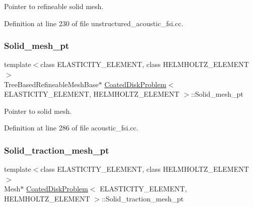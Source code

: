 Pointer to refineable solid mesh. 



Definition at line 230 of file unstructured\+\_\+acoustic\+\_\+fsi.\+cc.

\mbox{\label{classCoatedDiskProblem_aa9e9529dcb4bfd7793b868ab42a5d10e}} 
\subsubsection{\texorpdfstring{Solid\+\_\+mesh\+\_\+pt}{Solid\_mesh\_pt}\hspace{0.1cm}{\footnotesize\ttfamily [2/2]}}
{\footnotesize\ttfamily template$<$class E\+L\+A\+S\+T\+I\+C\+I\+T\+Y\+\_\+\+E\+L\+E\+M\+E\+NT, class H\+E\+L\+M\+H\+O\+L\+T\+Z\+\_\+\+E\+L\+E\+M\+E\+NT$>$ \\
Tree\+Based\+Refineable\+Mesh\+Base$\ast$ \hyperlink{classCoatedDiskProblem}{Coated\+Disk\+Problem}$<$ E\+L\+A\+S\+T\+I\+C\+I\+T\+Y\+\_\+\+E\+L\+E\+M\+E\+NT, H\+E\+L\+M\+H\+O\+L\+T\+Z\+\_\+\+E\+L\+E\+M\+E\+NT $>$\+::Solid\+\_\+mesh\+\_\+pt\hspace{0.3cm}{\ttfamily [private]}}



Pointer to solid mesh. 



Definition at line 286 of file acoustic\+\_\+fsi.\+cc.

\mbox{\label{classCoatedDiskProblem_a40be95c16554cc776ee45129c9153cae}} 
\subsubsection{\texorpdfstring{Solid\+\_\+traction\+\_\+mesh\+\_\+pt}{Solid\_traction\_mesh\_pt}}
{\footnotesize\ttfamily template$<$class E\+L\+A\+S\+T\+I\+C\+I\+T\+Y\+\_\+\+E\+L\+E\+M\+E\+NT, class H\+E\+L\+M\+H\+O\+L\+T\+Z\+\_\+\+E\+L\+E\+M\+E\+NT$>$ \\
Mesh$\ast$ \hyperlink{classCoatedDiskProblem}{Coated\+Disk\+Problem}$<$ E\+L\+A\+S\+T\+I\+C\+I\+T\+Y\+\_\+\+E\+L\+E\+M\+E\+NT, H\+E\+L\+M\+H\+O\+L\+T\+Z\+\_\+\+E\+L\+E\+M\+E\+NT $>$\+::Solid\+\_\+traction\+\_\+mesh\+\_\+pt\hspace{0.3cm}{\ttfamily [private]}}



